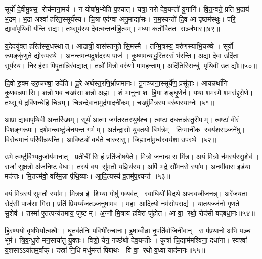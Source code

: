 सूर्यो॑ दे॒वीमु॒षस॒ रोच॑माना॒मर्य॑। न योषा॑म॒भ्ये॑ति प॒श्चात्। यत्रा॒ नरो॑ देव॒यन्तो॑ यु॒गानि॑। वि॒त॒न्वते॒ प्रति॑ भ॒द्राय॑ भ॒द्रम्। भ॒द्रा अश्वा॑ ह॒रित॒स्सूर्य॑स्य। चि॒त्रा एद॑ग्वा अनु॒माद्या॑सः। न॒म॒स्यन्तो॑ दि॒व आ पृ॒ष्ठम॑स्थुः। परि॒ द्यावा॑पृथि॒वी य॑न्ति स॒द्यः। तथ्सूर्य॑स्य देव॒त्वन्तन्म॑हि॒त्वम्। म॒ध्या कर्तो॒र्वित॑त॒ सञ्ज॑भार॥४९॥

य॒देदयु॑क्त ह॒रित॑स्स॒धस्थात्। आद्रात्री॒ वास॑स्तनुते सि॒मस्मै। तन्मि॒त्रस्य॒ वरु॑णस्याभि॒चख्षे। सूर्यो॑ रू॒पङ्कृ॑णुते॒ द्योरु॒पस्थे। अ॒न॒न्तम॒न्यद्रुश॑दस्य॒ पाज॑। कृ॒ष्णम॒न्यद्ध॒रित॒स्सं भ॑रन्ति। अ॒द्या दे॑वा॒ उदि॑ता॒ सूर्य॑स्य। निरह॑सः पिपृ॒तान्निर॑व॒द्यात्। तन्नो॑ मि॒त्रो वरु॑णो मामहन्ताम्। अदि॑ति॒स्सिन्धु॑ पृथि॒वी उ॒त द्यौः॥५०॥

दि॒वो रु॒क्म उ॑रु॒चख्षा॒ उदे॑ति। दू॒रे अ॑र्थस्त॒रणि॒र्भ्राज॑मानः। नू॒नञ्जना॒स्सूर्ये॑ण॒ प्रसू॑ताः। आयन्नर्था॑नि कृ॒णव॒न्नपासि। शन्नो॑ भव॒ चख्ष॑सा॒ शन्नो॒ अह्ना। शं भा॒नुना॒ श हि॒मा शङ्घृ॒णेन॑। यथा॒ शम॒स्मै शमस॑द्दुरो॒णे। तथ्सूर्य॒ द्रवि॑णन्धे॒हि चि॒त्रम्। चि॒त्रन्दे॒वाना॒मुद॑गा॒दनी॑कम्। चख्षु॑र्मि॒त्रस्य॒ वरु॑णस्या॒ग्नेः॥५१॥

आप्रा॒ द्यावा॑पृथि॒वी अ॒न्तरि॑ख्षम्। सूर्य॑ आ॒त्मा जग॑तस्त॒स्थुष॑श्च। त्वष्टा॒ दध॒त्तन्न॑स्तु॒रीपम्। त्वष्टा॑ वी॒रं पि॒शङ्ग॑रूपः। दशे॒मन्त्वष्टु॑र्जनयन्त॒ गर्भम्। अत॑न्द्रासो युव॒तयो॒ बिभ॑र्त्रम्। ति॒ग्मानी॑क॒ स्वय॑शस॒ञ्जने॑षु। वि॒रोच॑मानं॒ परि॑षीन्नयन्ति। आविष्ट्यो॑ वर्धते॒ चारु॑रासु। जि॒ह्माना॑मू॒र्ध्वस्वय॑शा उ॒पस्थे॥५२॥

उ॒भे त्वष्टु॑र्बिभ्यतु॒र्जाय॑मानात्। प्र॒तीची॑ सि॒हं प्रति॑जोषयेते। मि॒त्रो जना॒न्प्र स मि॑त्र। अ॒यं मि॒त्रो न॑म॒स्य॑स्सु॒शेव॑। राजा॑ सुक्ष॒त्रो अ॑जनिष्ट वे॒धाः। तस्य॑ व॒य सु॑म॒तौ य॒ज्ञिय॑स्य। अपि॑ भ॒द्रे सौ॑मन॒से स्या॑म। अ॒न॒मी॒वास॒ इड॑या॒ मद॑न्तः। मि॒तज्म॑वो॒ वरि॑म॒न्ना पृ॑थि॒व्याः। आ॒दि॒त्यस्य॑ व्र॒तमु॑प॒क्ष्यन्त॑॥५३॥

व॒यं मि॒त्रस्य॑ सुम॒तौ स्या॑म। मि॒त्रन्न ई शिम्या॒ गोषु॑ ग॒व्यव॑त्। स्वा॒धियो॑ वि॒दथे॑ अ॒फ्स्वजी॑जनन्न्। अरे॑जयता॒ रोद॑सी॒ पाज॑सा गि॒रा। प्रति॑ प्रि॒यय्यँ॑ज॒तञ्ज॒नुषा॒मव॑। म॒हा आ॑दि॒त्यो नम॑सोप॒सद्य॑। या॒त॒यज्ज॑नो गृण॒ते सु॒शेव॑। तस्मा॑ ए॒तत्पन्य॑तमाय॒ जुष्टम्। अ॒ग्नौ मि॒त्राय॑ ह॒विरा जु॑होत। आ वा॒ रथो॒ रोद॑सी बद्बधा॒नः॥५४॥

हि॒र॒ण्ययो॒ वृष॑भिर्या॒त्वश्वैः। घृ॒तव॑र्तनिः प॒विभी॑रुचा॒नः। इ॒षाव्वोँ॒ढा नृ॒पति॑र्वा॒जिनी॑वान्। स प॑प्रथा॒नो अ॒भि पञ्च॒ भूम॑। त्रि॒व॒न्धु॒रो मन॒साया॑तु यु॒क्तः। विशो॒ येन॒ गच्छ॑थो देव॒यन्तीः। कुत्रा॑ चि॒द्याम॑मश्विना॒ दधा॑ना। स्वश्वा॑ य॒शसाऽऽया॑तम॒र्वाक्। दस्रा॑ नि॒धिं मधु॑मन्तं पिबाथः। वि वा॒ रथो॑ व॒ध्वा॑ याद॑मानः॥५५॥

